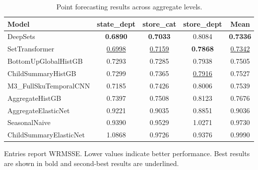 \begin{table}[H]
\centering
\caption{Point forecasting results across aggregate levels.}
\label{tab:main_point}
\begin{threeparttable}
\begin{tabular}{lcccc}
\toprule
Model & state\_dept & store\_cat & store\_dept & Mean \\
\midrule
DeepSets & \textbf{0.6890} & \textbf{0.7033} & 0.8084 & \textbf{0.7336} \\
SetTransformer & \underline{0.6998} & \underline{0.7159} & \textbf{0.7868} & \underline{0.7342} \\
BottomUpGlobalHistGB & 0.7293 & 0.7285 & 0.7938 & 0.7505 \\
ChildSummaryHistGB & 0.7299 & 0.7365 & \underline{0.7916} & 0.7527 \\
M3\_FullSkuTemporalCNN & 0.7185 & 0.7426 & 0.8006 & 0.7539 \\
AggregateHistGB & 0.7397 & 0.7508 & 0.8123 & 0.7676 \\
AggregateElasticNet & 0.9221 & 0.9035 & 0.8851 & 0.9036 \\
SeasonalNaive & 0.9390 & 0.9529 & 1.0271 & 0.9730 \\
ChildSummaryElasticNet & 1.0868 & 0.9726 & 0.9376 & 0.9990 \\
\bottomrule
\end{tabular}
\begin{tablenotes}
\footnotesize \item Entries report WRMSSE. Lower values indicate better performance. Best results are shown in bold and second-best results are underlined.
\end{tablenotes}
\end{threeparttable}
\end{table}

